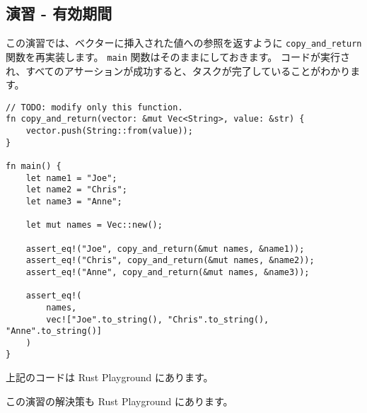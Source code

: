 \subsection{演習 - 有効期間}


この演習では、ベクターに挿入された値への参照を返すように \texttt{copy\_and\_return} 関数を再実装します。 \texttt{main} 関数はそのままにしておきます。 コードが実行され、すべてのアサーションが成功すると、タスクが完了していることがわかります。


\begin{lstlisting}[numbers=none]
// TODO: modify only this function.
fn copy_and_return(vector: &mut Vec<String>, value: &str) {
    vector.push(String::from(value));
}

fn main() {
    let name1 = "Joe";
    let name2 = "Chris";
    let name3 = "Anne";

    let mut names = Vec::new();

    assert_eq!("Joe", copy_and_return(&mut names, &name1));
    assert_eq!("Chris", copy_and_return(&mut names, &name2));
    assert_eq!("Anne", copy_and_return(&mut names, &name3));

    assert_eq!(
        names,
        vec!["Joe".to_string(), "Chris".to_string(), "Anne".to_string()]
    )
}
\end{lstlisting}

上記のコードは Rust Playground にあります。

この演習の解決策も Rust Playground にあります。